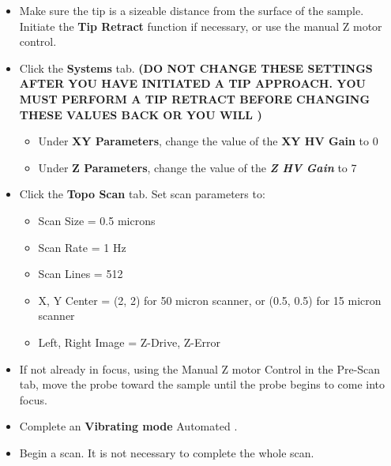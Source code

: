 \documentclass{../lab}
\begin{document}
{\begin{itemize}
        \item Make sure the tip is a sizeable distance from the surface of the sample.  Initiate the \textbf{Tip Retract }function if necessary, or use the manual Z motor control.

        \item Click the \textbf{Systems} tab. \textbf{(DO NOT CHANGE THESE SETTINGS AFTER YOU HAVE INITIATED A TIP APPROACH.  YOU MUST PERFORM A TIP RETRACT BEFORE CHANGING THESE VALUES BACK OR YOU WILL )}

    \begin{itemize}
        \item ​​Under \textbf{XY Parameters}, change the value of the \textbf{XY HV Gain} to 0

        \item Under \textbf{Z Parameters}, change the value of the \emph{\textbf{Z HV Gain}} to 7

    \end{itemize}

        \item Click the \textbf{Topo Scan} tab.  Set scan parameters to:

        \begin{itemize}
            \item Scan Size = 0.5 microns

            \item Scan Rate = 1 Hz

            \item Scan Lines = 512

            \item X, Y Center = (2, 2) for 50 micron scanner, or (0.5, 0.5) for 15 micron scanner

            \item Left, Right Image = Z-Drive, Z-Error

        \end{itemize}

        \item If not already in focus, using the Manual Z motor Control in the Pre-Scan tab, move the probe toward the sample until the probe begins to come into focus.

        \item Complete an \textbf{Vibrating mode} Automated \textbf{}.

        \item Begin a scan.  It is not necessary to complete the whole scan.


\end{itemize}}
\end{document}
